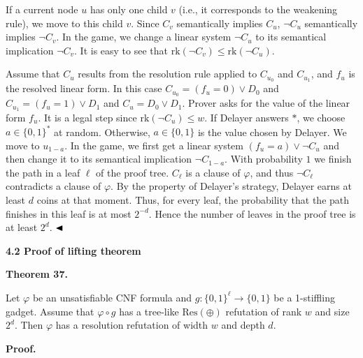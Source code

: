 \documentclass[10pt,a4paper]{article}
\begin{document}
If a current node $u$ has only one child $v$ (i.e., it corresponds to the weakening rule), we move to this child $v$. Since $C_{v}$ semantically implies $C_{u}$, $\lnot C_{u}$ semantically implies $\lnot C_{v}$. In the game, we change a linear system $\lnot C_{u}$ to its semantical implication $\lnot C_{v}$. It is easy to see that $\mathrm{rk}(\lnot C_{v})\leq\mathrm{rk}(\lnot C_{u})$.\par



Assume that $C_{u}$ results from the resolution rule applied to $C_{u_{0}}$ and $C_{u_{1}}$, and $f_{u}$ is the resolved linear form. In this case $C_{u_{0}}=(f_{u}=0)\lor D_{0}$ and $C_{u_{1}}=(f_{u}=1)\lor D_{1}$ and $C_{u}=D_{0}\lor D_{1}$.
Prover asks for the value of the linear form $f_{u}$. It is a legal step since $\mathrm{rk}(\lnot C_{u})\leq w$.
If Delayer answers $*$, we choose $a\in\{0,1\}^{*}$ at random. Otherwise, $a\in\{0,1\}$ is the value chosen by Delayer.
We move to $u_{1-a}$. In the game, we first get a linear system $(f_{u}=a)\lor\lnot C_{u}$ and then change it to its semantical implication $\lnot C_{1-a}$.
With probability $1$ we finish the path in a leaf $\ell$ of the proof tree. $C_{\ell}$ is a clause of $\varphi$, and thus $\lnot C_{\ell}$ contradicts a clause of $\varphi$. By the property of Delayer’s strategy, Delayer earns at least $d$ coins at that moment. Thus, for every leaf, the probability that the path finishes in this leaf is at most $2^{-d}$. Hence the number of leaves in the proof tree is at least $2^{d}$.
$\hfill\blacktriangleleft$\par


\par\medskip\noindent\textbf{
4.2 Proof of lifting theorem}\par



\par\medskip\noindent\textbf{
Theorem 37.
}\par



Let $\varphi$ be an unsatisfiable CNF formula and $g\colon\{0,1\}^{\ell}\to\{0,1\}$ be a 1-stiffling gadget.
Assume that $\varphi\circ g$ has a tree-like $\mathrm{Res}(\oplus)$ refutation of rank $w$ and size $2^{d}$. Then $\varphi$ has a resolution refutation of width $w$ and depth $d$.\par




\par\medskip\noindent\textbf{Proof.}\par
\end{document}
